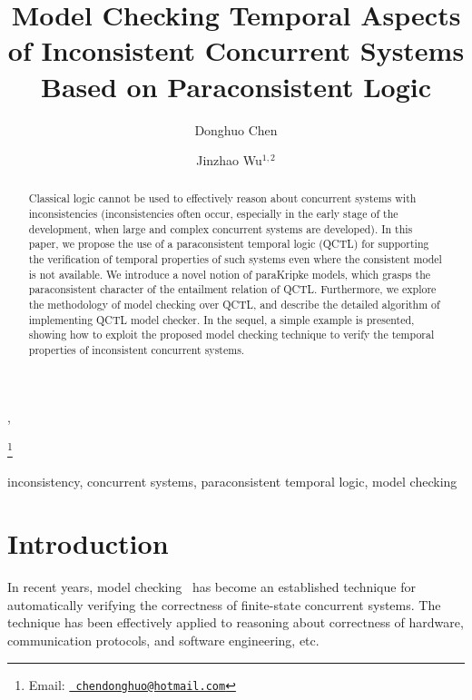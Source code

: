 \documentclass{entcs}
\begin{document}
\begin{frontmatter}

 \title{Model Checking Temporal Aspects of Inconsistent Concurrent Systems Based on Paraconsistent Logic
 }
 \author{Donghuo Chen},
 \author{Jinzhao Wu$^{1,2}$}
 \address{$^{1}$Chengdu Institute of Computer Applications\\
  Chinese Academy of Sciences, Chengdu 610041, China}
 \address{$^2$Fakult\"at f\"ur Mathematik und Informatik\\
 Universit\"at Mannheim, D7, 27, 68131 Mannheim, Germany}
 \thanks[myemail]{Email:
    \href{mailto:chendonghuo@hotmail.com}{\texttt{\normalshape
        chendonghuo@hotmail.com}}}

\begin{abstract}
Classical logic cannot be used to effectively reason about
concurrent systems with inconsistencies (inconsistencies often
occur, especially in the early stage of the development, when large
and complex concurrent systems are developed). In this paper, we
propose the use of a paraconsistent temporal logic (QCTL) for
supporting the verification of temporal properties of such systems
even where the consistent model is not available. We introduce a
novel notion of paraKripke models, which grasps the paraconsistent
character of the entailment relation of QCTL. Furthermore, we
explore the methodology of model checking over QCTL, and describe
the detailed algorithm of implementing QCTL model checker. In the
sequel, a simple example is presented, showing how to exploit the
proposed model checking technique to verify the temporal properties
of inconsistent concurrent systems.
\end{abstract}

\begin{keyword}
inconsistency, concurrent systems, paraconsistent temporal logic,
model checking
\end{keyword}

\end{frontmatter}

\section{Introduction}\label{intro}

In recent years, model checking~\cite{MC} has become an established
technique for automatically verifying the correctness of
finite-state concurrent systems. The technique has been effectively
applied to reasoning about correctness of hardware, communication
protocols, and software engineering, etc.
\end{document}
